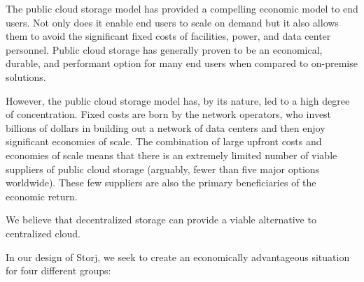 \documentclass[11pt,fleqn,openany]{book}
\begin{document}
The public cloud storage model has provided a compelling economic model to end
users. Not only does it enable end users to scale on demand but it also allows them to avoid the significant fixed costs of facilities, power, and data center
personnel. Public cloud storage has generally proven to be an economical,
durable, and performant option for many end users when compared to
on-premise solutions.

However, the public cloud storage model has, by its nature, led to a high
degree of concentration. Fixed costs are born by the network operators, who
invest billions of dollars in building out a network of data centers and
then enjoy significant economies of scale. The combination of large upfront
costs and economies of scale means that there is an extremely limited number
of viable suppliers of public cloud storage (arguably, fewer than five major
options worldwide). These few suppliers are also the primary beneficiaries of
the economic return.

We believe that decentralized storage can provide a viable alternative to
centralized cloud.

In our design of Storj, we seek to create an economically advantageous
situation for four different groups:
\end{document}
